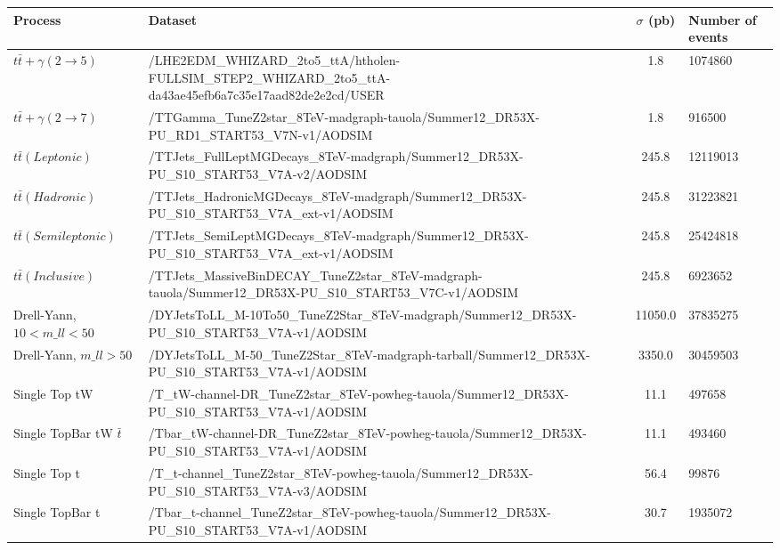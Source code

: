 \begin{table}
\begin{center}

\begin{tabular}{|l| p{12.5cm} |c|p{2cm}|}
\hline
	\textbf{Process} & \textbf{Dataset} & \textbf{$\sigma$ (pb)} & \textbf{Number of events} \\
\hline
	$t\bar{t}+\gamma (2\to5)$ & /LHE2EDM\_WHIZARD\_2to5\_ttA/htholen-FULLSIM\_STEP2\_WHIZARD\_2to5\_ttA-da43ae45efb6a7c35e17aad82de2e2cd/USER & 1.8 & 1074860 \\
	$t\bar{t}+\gamma (2\to7)$ & /TTGamma\_TuneZ2star\_8TeV-madgraph-tauola/Summer12\_DR53X-PU\_RD1\_START53\_V7N-v1/AODSIM & 1.8 & 916500\\ 
\hline	
	$t\bar{t}(Leptonic)$ & /TTJets\_FullLeptMGDecays\_8TeV-madgraph/Summer12\_DR53X-PU\_S10\_START53\_V7A-v2/AODSIM & 245.8 & 12119013\\
	$t\bar{t}(Hadronic)$ & /TTJets\_HadronicMGDecays\_8TeV-madgraph/Summer12\_DR53X-PU\_S10\_START53\_V7A\_ext-v1/AODSIM & 245.8 & 31223821\\
	$t\bar{t}(Semileptonic)$ & /TTJets\_SemiLeptMGDecays\_8TeV-madgraph/Summer12\_DR53X-PU\_S10\_START53\_V7A\_ext-v1/AODSIM & 245.8 & 25424818\\
	$t\bar{t}(Inclusive)$ & /TTJets\_MassiveBinDECAY\_TuneZ2star\_8TeV-madgraph-tauola/Summer12\_DR53X-PU\_S10\_START53\_V7C-v1/AODSIM & 245.8 & 6923652\\
\hline	
	Drell-Yann, $10 < m\_{ll} < 50$ & /DYJetsToLL\_M-10To50\_TuneZ2Star\_8TeV-madgraph/Summer12\_DR53X-PU\_S10\_START53\_V7A-v1/AODSIM & 11050.0 & 37835275\\
	Drell-Yann, $m\_{ll} > 50$ & /DYJetsToLL\_M-50\_TuneZ2Star\_8TeV-madgraph-tarball/Summer12\_DR53X-PU\_S10\_START53\_V7A-v1/AODSIM & 3350.0 & 30459503\\
\hline	
	Single Top tW & /T\_tW-channel-DR\_TuneZ2star\_8TeV-powheg-tauola/Summer12\_DR53X-PU\_S10\_START53\_V7A-v1/AODSIM & 11.1 & 497658 \\
	Single TopBar tW $\bar{t}$ & /Tbar\_tW-channel-DR\_TuneZ2star\_8TeV-powheg-tauola/Summer12\_DR53X-PU\_S10\_START53\_V7A-v1/AODSIM & 11.1 & 493460 \\
	Single Top t & /T\_t-channel\_TuneZ2star\_8TeV-powheg-tauola/Summer12\_DR53X-PU\_S10\_START53\_V7A-v3/AODSIM & 56.4 & 99876 \\
	Single TopBar t & /Tbar\_t-channel\_TuneZ2star\_8TeV-powheg-tauola/Summer12\_DR53X-PU\_S10\_START53\_V7A-v1/AODSIM & 30.7 & 1935072 \\

\end{tabular}
\end{center}
\end{table}
